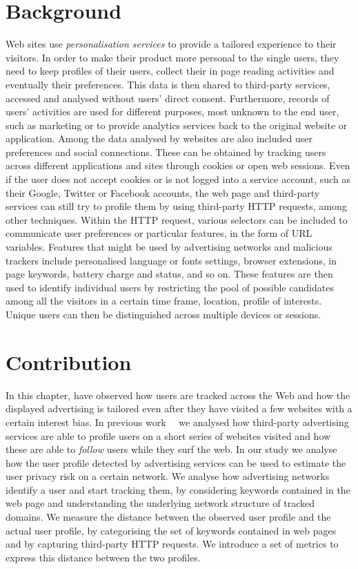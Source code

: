 \section{Background}
\noindent
Web sites use \emph{personalisation services} to provide a tailored experience to their visitors. In order to make their product more personal to the single users, they need to keep profiles of their users, collect their in page reading activities and eventually their preferences. This data is then shared to third-party services, accessed and analysed without users' direct consent. Furthermore, records of users' activities are used for different purposes, most unknown to the end user, such as marketing or to provide analytics services back to the original website or application.
Among the data analysed by websites are also included user preferences and social connections. These can be obtained by tracking users across different applications and sites through cookies or open web sessions. Even if the user does not accept cookies or is not logged into a service account, such as their Google, Twitter or Facebook accounts, the web page and third-party services can still try to profile them by using third-party HTTP requests, among other techniques. Within the HTTP request, various selectors can be included to communicate user preferences or particular features, in the form of URL variables. Features that might be used by advertising networks and malicious trackers include personalised language or fonts settings, browser extensions, in page keywords, battery charge and status, and so on. These features are then used to identify individual users by restricting the pool of possible candidates among all the visitors in a certain time frame, location, profile of interests. Unique users can then be distinguished across multiple devices or sessions.

\section{Contribution}

In this chapter, have observed how users are tracked across the Web and how the displayed advertising is tailored even after they have visited a few websites with a certain interest bias. In previous work~\cite{puglisi2016web}~\cite{puglisi2015you} we analysed how third-party advertising services are able to profile users on a short series of websites visited and how these are able to \emph{follow} users while they surf the web.
In our study we analyse how the user profile detected by advertising services can be used to estimate the user privacy risk on a certain network. We analyse how advertising networks identify a user and start tracking them, by considering keywords contained in the web page and understanding the underlying network structure of tracked domains. We measure the distance between the observed user profile and the actual user profile, by categorising the set of keywords contained in web pages and by capturing third-party HTTP requests. We introduce a set of metrics to express this distance between the two profiles.

